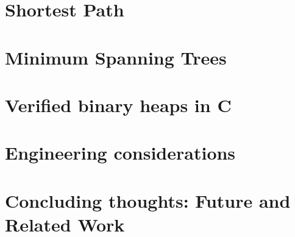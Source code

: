 \documentclass[runningheads]{llncs}
\newcommand\hide[1]{}
\begin{document}
	\section{Shortest Path}
	\label{sec:dijkstra}
	
	
    \section{Minimum Spanning Trees}
    \label{sec:mst}

	
	
	

    \section{Verified binary heaps in C}
    \label{sec:binheap}
    

	
    \section{Engineering considerations}
    \label{sec:stats}

	

%	

	\section{Concluding thoughts: Future and Related Work}
	\label{sec:conclusion}

	
	
	
	\appendix
	\label{sec:apx}
	
	
\end{document}
